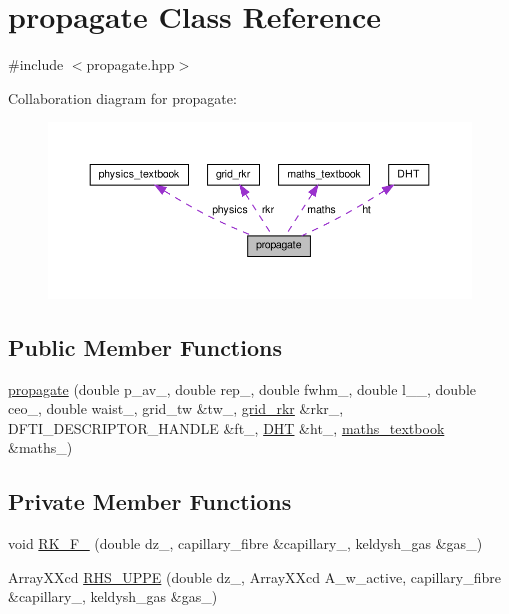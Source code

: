\hypertarget{classpropagate}{}\section{propagate Class Reference}
\label{classpropagate}


{\ttfamily \#include $<$propagate.\+hpp$>$}



Collaboration diagram for propagate\+:
\nopagebreak
\begin{figure}[H]
\begin{center}
\leavevmode
\includegraphics[width=350pt]{classpropagate__coll__graph}
\end{center}
\end{figure}
\subsection*{Public Member Functions}
\begin{DoxyCompactItemize}
\item 
\hyperlink{classpropagate_a87a93848027b75f6963d0fd81e233249}{propagate} (double p\+\_\+av\+\_\+, double rep\+\_\+, double fwhm\+\_\+, double l\+\_\+\_\+, double ceo\+\_\+, double waist\+\_\+, grid\+\_\+tw \&tw\+\_\+, \hyperlink{classgrid__rkr}{grid\+\_\+rkr} \&rkr\+\_\+, D\+F\+T\+I\+\_\+\+D\+E\+S\+C\+R\+I\+P\+T\+O\+R\+\_\+\+H\+A\+N\+D\+LE \&ft\+\_\+, \hyperlink{class_d_h_t}{D\+HT} \&ht\+\_\+, \hyperlink{classmaths__textbook}{maths\+\_\+textbook} \&maths\+\_\+)
\end{DoxyCompactItemize}
\subsection*{Private Member Functions}
\begin{DoxyCompactItemize}
\item 
void \hyperlink{classpropagate_a3bbf66416adb4c799c4664aef6868329}{R\+K\+\_\+\+F\+\_} (double dz\+\_\+, capillary\+\_\+fibre \&capillary\+\_\+, keldysh\+\_\+gas \&gas\+\_\+)
\item 
Array\+X\+Xcd \hyperlink{classpropagate_a9f7db42c8dfe3f54c0ac1854c18e89cc}{R\+H\+S\+\_\+\+U\+P\+PE} (double dz\+\_\+, Array\+X\+Xcd A\+\_\+w\+\_\+active, capillary\+\_\+fibre \&capillary\+\_\+, keldysh\+\_\+gas \&gas\+\_\+)
\end{DoxyCompactItemize}
